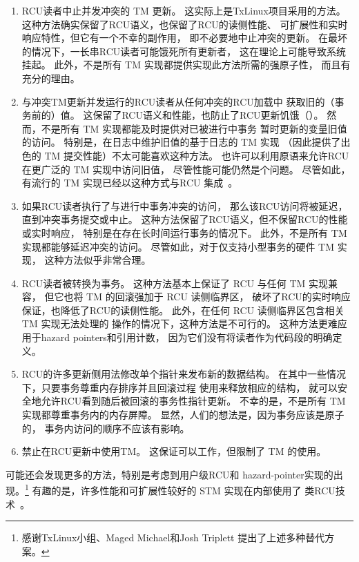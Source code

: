 \begin{enumerate}
\item	RCU读者中止并发冲突的 TM 更新。
	这实际上是TxLinux项目采用的方法。
	这种方法确实保留了RCU语义，也保留了RCU的读侧性能、
	可扩展性和实时响应特性，但它有一个不幸的副作用，
	即不必要地中止冲突的更新。
	在最坏的情况下，一长串RCU读者可能饿死所有更新者，
	这在理论上可能导致系统挂起。
	此外，不是所有 TM 实现都提供实现此方法所需的强原子性，
	而且有充分的理由。
\item	与冲突TM更新并发运行的RCU读者从任何冲突的RCU加载中
	获取旧的（事务前的）值。
	这保留了RCU语义和性能，也防止了RCU更新饥饿（）。
	然而，不是所有 TM 实现都能及时提供对已被进行中事务
	暂时更新的变量旧值的访问。
	特别是，在日志中维护旧值的基于日志的 TM 实现
	（因此提供了出色的 TM 提交性能）不太可能喜欢这种方法。
	也许可以利用原语来允许RCU
	在更广泛的 TM 实现中访问旧值，
	尽管性能可能仍然是个问题。
	尽管如此，有流行的 TM 实现已经以这种方式与RCU
	集成~\cite{DonaldEPorter2007TRANSACT,PhilHoward2011RCUTMRBTree,
	PhilipWHoward2013RCUrbtree}。
\item	如果RCU读者执行了与进行中事务冲突的访问，
	那么该RCU访问将被延迟，直到冲突事务提交或中止。
	这种方法保留了RCU语义，但不保留RCU的性能或实时响应，
	特别是在存在长时间运行事务的情况下。
	此外，不是所有 TM 实现都能够延迟冲突的访问。
	尽管如此，对于仅支持小型事务的硬件 TM 实现，
	这种方法似乎非常合理。
\item	RCU读者被转换为事务。
	这种方法基本上保证了 RCU 与任何 TM 实现兼容，
	但它也将 TM 的回滚强加于 RCU 读侧临界区，
	破坏了RCU的实时响应保证，也降低了RCU的读侧性能。
	此外，在任何 RCU 读侧临界区包含相关 TM 实现无法处理的
	操作的情况下，这种方法是不可行的。
	这种方法更难应用于hazard pointers和引用计数，
	因为它们没有将读者作为代码段的明确定义。
\item	RCU的许多更新侧用法修改单个指针来发布新的数据结构。
	在其中一些情况下，只要事务尊重内存排序并且回滚过程
	使用来释放相应的结构，
	就可以安全地允许RCU看到随后被回滚的事务性指针更新。
	不幸的是，不是所有 TM 实现都尊重事务内的内存屏障。
	显然，人们的想法是，因为事务应该是原子的，
	事务内访问的顺序不应该有影响。
\item	禁止在RCU更新中使用TM。
	这保证可以工作，但限制了 TM 的使用。
\end{enumerate}

可能还会发现更多的方法，特别是考虑到用户级RCU和
hazard-pointer实现的出现。\footnote{
	感谢TxLinux小组、Maged Michael和Josh Triplett
	提出了上述多种替代方案。}
有趣的是，许多性能和可扩展性较好的 STM 实现在内部使用了
类RCU技术~\cite{UCAM-CL-TR-579,KeirFraser2007withoutLocks,Gu:2019:PSE:3358807.3358885,Kim:2019:MSR:3297858.3304040}。

